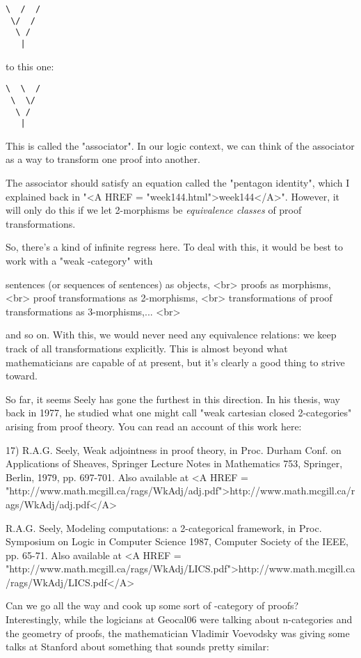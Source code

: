 \begin{verbatim}
\  /  /
 \/  /
  \ /
   |
\end{verbatim}
    
to this one:

\begin{verbatim}
\  \  /
 \  \/
  \ /
   |
\end{verbatim}
    

This is called the "associator".  In our logic context, we can 
think of 
the associator as a way to transform one proof into another.  

The associator should satisfy an equation called 
the "pentagon identity",
which I explained back in "<A HREF = "week144.html">week144</A>".  
However, it will only do this if
we let 2-morphisms be \emph{equivalence classes} of proof transformations.

So, there's a kind of infinite regress here.  To deal with this, it
would be best to work with a "weak \omega -category" with

sentences (or sequences of sentences) as objects, <br>
proofs as morphisms, <br>
proof transformations as 2-morphisms, <br>
transformations of proof transformations as 3-morphisms,... <br>

and so on.   With this, we would never need any equivalence relations:
we keep track of all transformations explicitly.  This is almost beyond 
what mathematicians are capable of at present, but it's clearly a good 
thing to strive toward.

So far, it seems Seely has gone the furthest in this direction.
In his thesis, way back in 1977, he studied what one might call "weak 
cartesian closed 2-categories" arising from proof theory.  You can read 
an account of this work here:

17) R.A.G. Seely, Weak adjointness in proof theory, in Proc. Durham Conf. 
on Applications of Sheaves, Springer Lecture Notes in Mathematics 753, 
Springer, Berlin, 1979, pp. 697-701.  Also available at
<A HREF = "http://www.math.mcgill.ca/rags/WkAdj/adj.pdf">http://www.math.mcgill.ca/rags/WkAdj/adj.pdf</A>

R.A.G. Seely, Modeling computations: a 2-categorical framework, in 
Proc. Symposium on Logic in Computer Science 1987, Computer Society 
of the IEEE, pp. 65-71.  Also available at 
<A HREF = "http://www.math.mcgill.ca/rags/WkAdj/LICS.pdf">http://www.math.mcgill.ca/rags/WkAdj/LICS.pdf</A>

Can we go all the way and cook up some sort of \omega -category of proofs?  
Interestingly,
while the logicians at Geocal06 were talking about n-categories and
the geometry of proofs, the mathematician Vladimir Voevodsky was giving
some talks at Stanford about something that sounds pretty similar:


